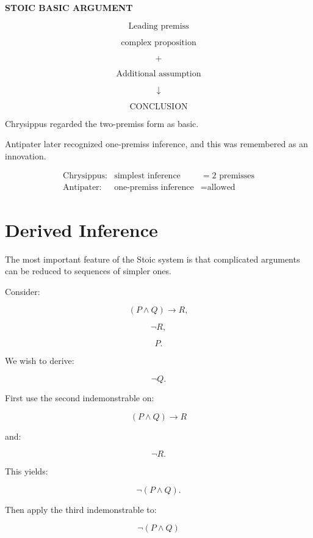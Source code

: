 \documentclass[11pt]{article}
\begin{document}
\begin{whiteboard}
\textbf{STOIC BASIC ARGUMENT}

\[
\boxed{\text{Leading premiss}}
\]

\[
\text{complex proposition}
\]

\[
+
\]

\[
\boxed{\text{Additional assumption}}
\]

\[
\downarrow
\]

\[
\text{CONCLUSION}
\]
\end{whiteboard}

Chrysippus regarded the two-premiss form as basic.

Antipater later recognized one-premiss inference, and this was
remembered as an innovation.

\begin{whiteboard}
\[
\begin{array}{rcl}
\text{Chrysippus:}
&
\text{simplest inference}
&=
2\text{ premisses}
\\[0.4em]
\text{Antipater:}
&
\text{one-premiss inference}
&=
\text{allowed}
\end{array}
\]
\end{whiteboard}

\section{Derived Inference}

The most important feature of the Stoic system is that complicated
arguments can be reduced to sequences of simpler ones.

Consider:

\[
(P\land Q)\rightarrow R,
\]

\[
\neg R,
\]

\[
P.
\]

We wish to derive:

\[
\neg Q.
\]

First use the second indemonstrable on:

\[
(P\land Q)\rightarrow R
\]

and:

\[
\neg R.
\]

This yields:

\[
\neg(P\land Q).
\]

Then apply the third indemonstrable to:

\[
\neg(P\land Q)
\]
\end{document}
